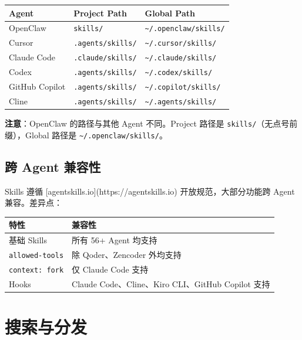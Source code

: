 \documentclass[11pt,a4paper]{article}
\begin{document}
\begin{table}[h]
\centering
\begin{tabularx}{\linewidth}{lll}
\toprule
\textbf{Agent} & \textbf{Project Path} & \textbf{Global Path} \\
\midrule
OpenClaw & \texttt{skills/} & \texttt{\textasciitilde/.openclaw/skills/} \\
Cursor & \texttt{.agents/skills/} & \texttt{\textasciitilde/.cursor/skills/} \\
Claude Code & \texttt{.claude/skills/} & \texttt{\textasciitilde/.claude/skills/} \\
Codex & \texttt{.agents/skills/} & \texttt{\textasciitilde/.codex/skills/} \\
GitHub Copilot & \texttt{.agents/skills/} & \texttt{\textasciitilde/.copilot/skills/} \\
Cline & \texttt{.agents/skills/} & \texttt{\textasciitilde/.agents/skills/} \\
\bottomrule
\end{tabularx}
\end{table}

\textbf{注意}：OpenClaw 的路径与其他 Agent 不同。Project 路径是 \texttt{skills/}（无点号前缀），Global 路径是 \texttt{\textasciitilde/.openclaw/skills/}。

\subsection{跨 Agent 兼容性}

Skills 遵循 [agentskills.io](https://agentskills.io) 开放规范，大部分功能跨 Agent 兼容。差异点：

\begin{table}[h]
\centering
\begin{tabularx}{\linewidth}{lX}
\toprule
\textbf{特性} & \textbf{兼容性} \\
\midrule
基础 Skills & 所有 56+ Agent 均支持 \\
\texttt{allowed-tools} & 除 Qoder、Zencoder 外均支持 \\
\texttt{context: fork} & 仅 Claude Code 支持 \\
Hooks & Claude Code、Cline、Kiro CLI、GitHub Copilot 支持 \\
\bottomrule
\end{tabularx}
\end{table}

\section{搜索与分发}
\end{document}
